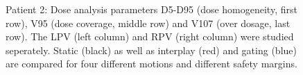 \documentclass[type=dr, dr=rernat, accentcolor=tud7b,colorbacktitle, bigchapter, openright, twoside, 12pt ]{tudthesis}
\begin{document}
\begin{figure}[H]
{ }
\caption{Patient 2: Dose analysis parameters D5-D95 (dose homogeneity, first row), V95 (dose coverage, middle row) and V107 (over dosage, last row). 
The LPV (left column) and RPV (right column) were studied seperately. Static (black) as well as interplay (red) and gating (blue) 
are compared for four different motions and different safety margins.}
\label{static_interplay_gating_Pat02}
\end{figure}

\newpage 

\begin{figure}[H]
 \subfigure[V95: LPV]{
}
\end{figure}
\end{document}
